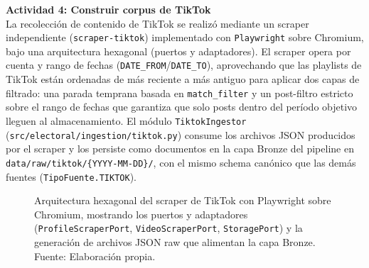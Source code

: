 \documentclass[listof=nochaptergap,12pt,times,authoryear]{report}
\begin{document}
\textbf{Actividad 4: Construir corpus de TikTok}
\\
La recolección de contenido de TikTok se realizó mediante un scraper independiente
(\texttt{scraper-tiktok}) implementado con \texttt{Playwright} sobre Chromium, bajo una
arquitectura hexagonal (puertos y adaptadores). El scraper opera por cuenta y rango de
fechas (\texttt{DATE\_FROM}/\texttt{DATE\_TO}), aprovechando que las playlists de TikTok
están ordenadas de más reciente a más antiguo para aplicar dos capas de filtrado: una
parada temprana basada en \texttt{match\_filter} y un post-filtro estricto sobre el
rango de fechas que garantiza que solo posts dentro del período objetivo lleguen al
almacenamiento. El módulo \texttt{TiktokIngestor}
(\texttt{src/electoral/ingestion/tiktok.py}) consume los archivos JSON producidos por
el scraper y los persiste como documentos en la capa Bronze del pipeline en
\texttt{data/raw/tiktok/\{YYYY-MM-DD\}/}, con el mismo schema canónico que las demás
fuentes (\texttt{TipoFuente.TIKTOK}).

\begin{figure}[!ht]
    \begin{center}

        \caption[Arquitectura hexagonal del scraper de TikTok con Playwright]{Arquitectura hexagonal del scraper de TikTok con Playwright sobre Chromium, mostrando los puertos y adaptadores (\texttt{ProfileScraperPort}, \texttt{VideoScraperPort}, \texttt{StoragePort}) y la generación de archivos JSON raw que alimentan la capa Bronze.\\
            Fuente: Elaboración propia.}
        \label{5:fig6b}
    \end{center}
\end{figure}
\end{document}
